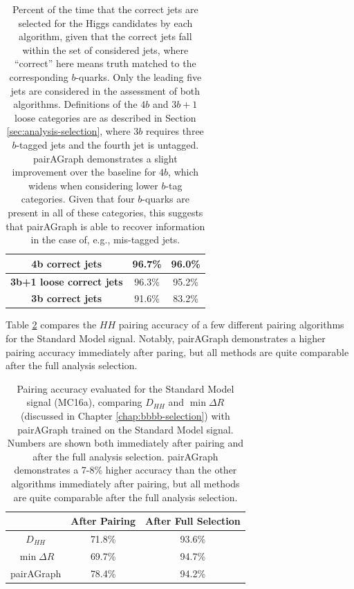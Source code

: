 \begin{table}
\centering
\begin{tabular}{|c | c | c|}
\hline
\textbf{4b correct jets} & 96.7\% & 96.0\%\\
\hline
\textbf{3b+1 loose correct jets} & 96.3\% & 95.2\%\\
\hline
\textbf{3b correct jets} & 91.6\% & 83.2\%\\
\hline
\end{tabular}
\caption{\label{tbl:pag-jet-sel} Percent of the time that the correct jets are selected for the 
Higgs candidates by each algorithm, given that the correct jets fall within the set of considered jets,  
where ``correct'' here means truth matched to the corresponding $b$-quarks. Only the leading five jets 
are considered in the assessment of both algorithms. Definitions of the $4b$ and $3b+1$ loose categories 
are as described in Section \ref{sec:analysis-selection}, where $3b$ requires three $b$-tagged jets and 
the fourth jet is untagged. pairAGraph demonstrates a slight improvement over the 
baseline for $4b$, which widens when considering lower $b$-tag categories. Given that four $b$-quarks are present 
in all of these categories, this suggests that pairAGraph is able to recover information in the case of, 
e.g., mis-tagged jets.}
\end{table}


Table \ref{tbl:pag-accuracy} compares the $HH$ pairing accuracy of a few different pairing algorithms for the 
Standard Model signal. Notably, pairAGraph demonstrates a higher pairing accuracy immediately after paring, 
but all methods are quite comparable after the full analysis selection.
\begin{table}
\centering
\begin{tabular}{|c | c | c|}
\hline
&\textbf{After Pairing} & \textbf{After Full Selection}\\
\hline \hline
$D_{HH}$ & 71.8\% & 93.6\% \\
\hline
$\min{\Delta R}$ & 69.7\% & 94.7\% \\
\hline
pairAGraph & 78.4\% & 94.2\%\\
\hline
\end{tabular}
\caption{\label{tbl:pag-accuracy} Pairing accuracy evaluated for the Standard Model signal (MC16a), comparing 
$D_{HH}$ and $\min{\Delta R}$ (discussed in Chapter \ref{chap:bbbb-selection}) with pairAGraph trained on the Standard Model 
signal. Numbers are shown both immediately after pairing and after the full analysis selection. pairAGraph demonstrates 
a 7-8\% higher accuracy than the other algorithms immediately after pairing, but all methods are quite comparable after 
the full analysis selection.}
\end{table}

